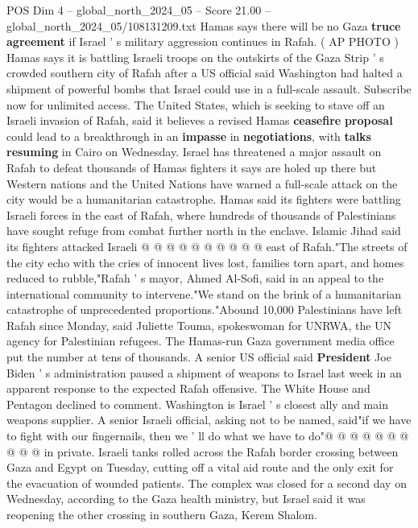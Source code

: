 \begin{textsample}{POS Dim 4 – global\_north\_2024\_05 – Score 21.00 – global\_north\_2024\_05/108131209.txt}  \label{ex:f4_pos_336}
Hamas says there will be no Gaza \textbf{truce} \textbf{agreement} if Israel ' s military aggression continues in Rafah. ( AP PHOTO ) Hamas says it is battling Israeli troops on the outskirts of the Gaza Strip ' s crowded southern city of Rafah after a US official said Washington had halted a shipment of powerful bombs that Israel could use in a full-scale assault.
Subscribe now for unlimited access.
The United States, which is seeking to stave off an Israeli invasion of Rafah, said it believes a revised Hamas \textbf{ceasefire} \textbf{proposal} could lead to a breakthrough in an \textbf{impasse} in \textbf{negotiations}, with \textbf{talks} \textbf{resuming} in Cairo on Wednesday.
Israel has threatened a major assault on Rafah to defeat thousands of Hamas fighters it says are holed up there but Western nations and the United Nations have warned a full-scale attack on the city would be a humanitarian catastrophe.
Hamas said its fighters were battling Israeli forces in the east of Rafah, where hundreds of thousands of Palestinians have sought refuge from combat further north in the enclave.
Islamic Jihad said its fighters attacked Israeli @ @ @ @ @ @ @ @ @ @ east of Rafah."The streets of the city echo with the cries of innocent lives lost, families torn apart, and homes reduced to rubble,"Rafah ' s mayor, Ahmed Al-Sofi, said in an appeal to the international community to intervene."We stand on the brink of a humanitarian catastrophe of unprecedented proportions."Abound 10,000 Palestinians have left Rafah since Monday, said Juliette Touma, spokeswoman for UNRWA, the UN agency for Palestinian refugees.
The Hamas-run Gaza government media office put the number at tens of thousands.
A senior US official said \textbf{President} Joe Biden ' s administration paused a shipment of weapons to Israel last week in an apparent response to the expected Rafah offensive.
The White House and Pentagon declined to comment.
Washington is Israel ' s closest ally and main weapons supplier.
A senior Israeli official, asking not to be named, said"if we have to fight with our fingernails, then we ' ll do what we have to do"@ @ @ @ @ @ @ @ @ @ in private.
Israeli tanks rolled across the Rafah border crossing between Gaza and Egypt on Tuesday, cutting off a vital aid route and the only exit for the evacuation of wounded patients.
The complex was closed for a second day on Wednesday, according to the Gaza health ministry, but Israel said it was reopening the other crossing in southern Gaza, Kerem Shalom.

\end{textsample}
